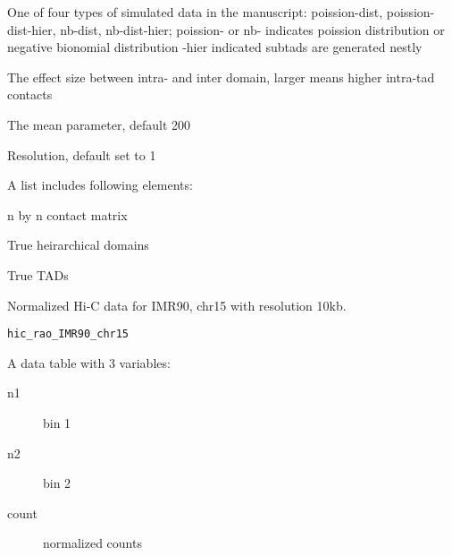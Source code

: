 \documentclass[a4paper]{book}
\begin{document}
\begin{Arguments}
\begin{ldescription}
\item[\code{stype}] One of four types of simulated data in the manuscript:
poission-dist, poission-dist-hier, nb-dist, nb-dist-hier;
poission- or nb- indicates poission distribution or negative bionomial distribution
-hier indicated subtads are generated nestly

\item[\code{nratio}] The effect size between intra- and inter domain, larger means higher intra-tad contacts

\item[\code{mu0}] The mean parameter, default 200

\item[\code{resl}] Resolution, default set to 1
\end{ldescription}
\end{Arguments}
%
\begin{Value}
A list includes following elements:
\begin{ldescription}
\item[\code{hic\_mat}] n by n contact matrix
\item[\code{hierTads}] True heirarchical domains
\item[\code{tads\_true}] True TADs
\end{ldescription}
\end{Value}
%
\begin{Description}\relax
Normalized Hi-C data for IMR90, chr15 with resolution 10kb.
\end{Description}
%
\begin{Usage}
\begin{verbatim}
hic_rao_IMR90_chr15
\end{verbatim}
\end{Usage}
%
\begin{Format}
A data table with 3 variables:
\begin{description}

\item[n1] bin 1
\item[n2] bin 2
\item[count] normalized counts

\end{description}
\end{Format}
\end{document}
